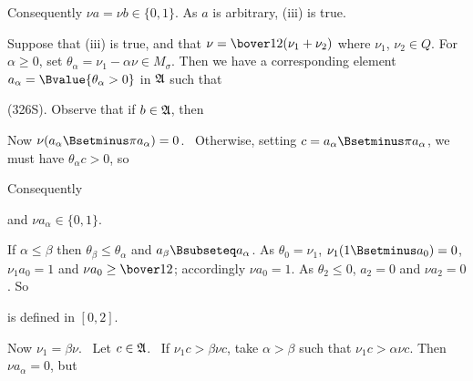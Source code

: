{

\noindent Consequently
$\nu a=\nu b\in\{0,1\}$.   As $a$ is arbitrary, (iii) is true.

\medskip

 Suppose that (iii) is true, and that
$\nu=\bover12(\nu_1+\nu_2)$ where $\nu_1$, $\nu_2\in Q$.   For
$\alpha\ge 0$, set $\theta_{\alpha}=\nu_1-\alpha\nu\in M_{\sigma}$.
Then we have a corresponding
element $a_{\alpha}=\Bvalue{\theta_{\alpha}>0}$ in $\frak A$ such that


\noindent(326S).   Observe that if $b\in\frak A$, then



Now $\nu(a_{\alpha}\Bsetminus\pi a_{\alpha})=0$.
\Prf\Quer\ Otherwise, setting $c=a_{\alpha}\Bsetminus\pi a_{\alpha}$, we
must have $\theta_{\alpha}c>0$, so


\noindent Consequently


\noindent and $\nu a_{\alpha}\in\{0,1\}$.

If $\alpha\le\beta$ then $\theta_{\beta}\le\theta_{\alpha}$ and
$a_{\beta}\Bsubseteq a_{\alpha}$.   As $\theta_0=\nu_1$,
$\nu_1(1\Bsetminus a_0)=0$,
$\nu_1a_0=1$ and $\nu a_0\ge\bover12$;  accordingly $\nu a_0=1$.
As $\theta_2\le 0$, $a_2=0$ and $\nu a_2=0$.   So


\noindent is defined in $[0,2]$.

Now $\nu_1=\beta\nu$.   \Prf\ Let $c\in\frak A$.
\Quer\ If $\nu_1c>\beta\nu c$, take $\alpha>\beta$ such
that $\nu_1c>\alpha\nu c$.   Then $\nu a_{\alpha}=0$, but

}
